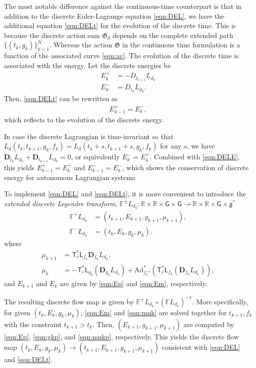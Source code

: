 \documentclass[letterpaper, 10pt, conference]{ieeeconf}
\newcommand{\G}{\ensuremath{\mathsf{G}}}
\newcommand{\T}{\ensuremath{\mathsf{T}}}
\renewcommand{\L}{\ensuremath{\mathsf{L}}}
\renewcommand{\Re}{\ensuremath{\mathbb{R}}}
\newcommand{\D}{\ensuremath{\mathbf{D}}}
\newcommand{\Ad}{\ensuremath{\mathrm{Ad}}}
\newcommand{\g}{\ensuremath{\mathfrak{g}}}
\begin{document}
The most notable difference against the continuous-time counterpart is that in addition to the discrete Euler-Lagrange equation \eqref{eqn:DEL}, we have the additional equation \eqref{eqn:DELt} for the evolution of the discrete time. 
This is because the discrete action sum $\mathfrak{G}_d$ depends on the complete extended path $\{(t_k,g_k)\}_{k=1}^N$.
Whereas the action $\mathfrak{G}$ in the continuous time formulation is a function of the associated curve \eqref{eqn:ac}.
The evolution of the discrete time is associated with the energy.
Let the discrete energies be
\begin{align}
    E^+_k &= - D_{t_{k+1}} L_{d_k}\label{eqn:Ep}\\
    E^-_k &= D_{t_{k}} L_{d_k}.\label{eqn:Em}
\end{align}
Then, \eqref{eqn:DELt} can be rewritten as
\begin{align}
    E^+_{k-1} = E^-_k,\label{eqn:DELE}
\end{align}
which reflects to the evolution of the discrete energy.

In case the discrete Lagrangian is time-invariant so that $L_d(t_k,t_{k+1},g_k,f_k) =  L_d(t_k+s,t_{k+1}+s,g_k,f_k)$ for any $s$, 
we have $\D_{t_k}L_{d_k} + \D_{t_{k+1}}L_{d_k}=0$, or equivalently $E^-_k = E^+_k$. 
Combined with \eqref{eqn:DELE}, this yields $E_{k-1}^+ = E_k^+$ and $E_{k-1}^-=E_k^-$, which shows the conservation of discrete energy for autonomous Lagrangian systems. 

To implement \eqref{eqn:DEL} and \eqref{eqn:DELt}, it is more convenient to introduce the \textit{extended discrete Legendre transform}, $\mathbb{F}^\pm L_{d_k}: \Re\times\Re \times \G \times \G \rightarrow \Re\times \Re\times\G\times\g^*$
\begin{align}
    \mathbb{F}^+ L_{d_k} &= (t_{k+1}, E_{k+1}, g_{k+1}, \mu_{k+1}),\\
    \mathbb{F}^- L_{d_k} &= (t_k, E_k, g_{k}, \mu_{k}).
\end{align}
where
\begin{align}
    \mu_{k+1} & = \T^*_e\L_{f_k} \D_{f_k} L_{d_k},\label{eqn:mukp}\\
    \mu_k & = -\T^*_e\L_{g_k}(\D_{g_k} L_{d_k})+ \Ad^*_{f_k^{-1}} (\T^*_e\L_{f_k}(\D_{f_k} L_{d_k})),\label{eqn:muk}
\end{align}
and $E_{k+1}$ and $E_k$ are given by \eqref{eqn:Ep} and \eqref{eqn:Em}, respectively. 

The resulting discrete flow map is given by $\mathbb{F}^+L_{d_k} \circ (\mathbb{F}L_{d_k})^{-1}$. 
More specifically, for given $(t_k, E_k, g_k, \mu_k)$, \eqref{eqn:Em} and \eqref{eqn:muk} are solved together for $t_{k+1},f_k$ with the constraint $t_{k+1}>t_k$.
Then, $(E_{k+1}, g_{k+1},\mu_{k+1})$ are computed by \eqref{eqn:Ep}, \eqref{eqn:gkp}, and \eqref{eqn:mukp}, respectively.
This yields the discrete flow map $(t_k, E_k, g_k, \mu_k)\rightarrow(t_{k+1}, E_{k+1}, g_{k+1}, \mu_{k+1})$ consistent with \eqref{eqn:DEL} and \eqref{eqn:DELt}.
\end{document}

